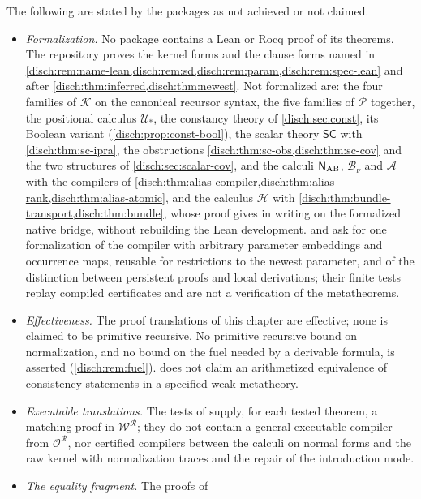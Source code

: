 The following are stated by the packages as not achieved or not claimed.
\begin{itemize}
\item \emph{Formalization.} No package contains a Lean or Rocq proof of
 its theorems. The repository proves the kernel forms and the clause forms
 named in
 \cref{disch:rem:name-lean,disch:rem:sd,disch:rem:param,disch:rem:spec-lean}
 and after \cref{disch:thm:inferred,disch:thm:newest}. Not formalized are:
 the four families of $\mathcal K$ on the canonical recursor syntax, the
 five families of $\mathcal P$ together, the positional calculus
 $\mathcal U_*$, the constancy theory of \cref{disch:sec:const}, its
 Boolean variant (\cref{disch:prop:const-bool}), the scalar theory
 $\mathsf{SC}$ with \cref{disch:thm:sc-ipra}, the obstructions
 \cref{disch:thm:sc-obs,disch:thm:sc-cov} and the two structures of
 \cref{disch:sec:scalar-cov}, and the
 calculi $\mathsf{N}_{\mathrm{AB}}$, $\mathcal B_{\nu}$ and $\mathcal A$ with the
 compilers of \cref{disch:thm:alias-compiler,disch:thm:alias-rank,disch:thm:alias-atomic},
 and the calculus $\mathcal H$ with
 \cref{disch:thm:bundle-transport,disch:thm:bundle}, whose proof
  gives in writing on the formalized native
 bridge, without rebuilding the Lean development.
  and  ask for one formalization of
 the compiler with arbitrary parameter embeddings and occurrence maps,
 reusable for restrictions to the newest parameter, and of the distinction
 between persistent proofs and local derivations; their finite tests
 replay compiled certificates and are not a verification of the
 metatheorems.
\item \emph{Effectiveness.} The proof translations of this chapter are
 effective; none is claimed to be primitive recursive. No primitive
 recursive bound on normalization, and no bound on the fuel needed by a
 derivable formula, is asserted (\cref{disch:rem:fuel}).
  does not claim an arithmetized equivalence of
 consistency statements in a specified weak metatheory.
\item \emph{Executable translations.} The tests of
  supply, for each tested theorem, a matching
 proof in $\mathcal W^{\mathcal R}$; they do not contain a general
 executable compiler from $\mathcal O^{\mathcal R}$, nor certified
 compilers between the calculi on normal forms and the raw kernel with
 normalization traces and the repair of the introduction mode.
\item \emph{The equality fragment.} The proofs of

\end{itemize}
